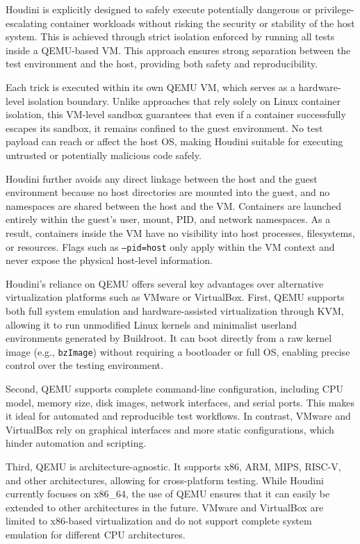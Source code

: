 \begin{doublespace}
Houdini is explicitly designed to safely execute potentially dangerous or privilege-escalating container workloads without risking the security or stability of the host system. This is achieved through strict isolation enforced by running all tests inside a QEMU-based VM. This approach ensures strong separation between the test environment and the host, providing both safety and reproducibility.

Each trick is executed within its own QEMU VM, which serves as a hardware-level isolation boundary. Unlike approaches that rely solely on Linux container isolation, this VM-level sandbox guarantees that even if a container successfully escapes its sandbox, it remains confined to the guest environment. No test payload can reach or affect the host OS, making Houdini suitable for executing untrusted or potentially malicious code safely.

Houdini further avoids any direct linkage between the host and the guest environment because no host directories are mounted into the guest, and no namespaces are shared between the host and the VM. Containers are launched entirely within the guest's user, mount, PID, and network namespaces. As a result, containers inside the VM have no visibility into host processes, filesystems, or resources. Flags such as \texttt{--pid=host} only apply within the VM context and never expose the physical host-level information.

Houdini's reliance on QEMU offers several key advantages over alternative virtualization platforms such as VMware or VirtualBox. First, QEMU supports both full system emulation and hardware-assisted virtualization through KVM, allowing it to run unmodified Linux kernels and minimalist userland environments generated by Buildroot. It can boot directly from a raw kernel image (e.g., \texttt{bzImage}) without requiring a bootloader or full OS, enabling precise control over the testing environment.

Second, QEMU supports complete command-line configuration, including CPU model, memory size, disk images, network interfaces, and serial ports. This makes it ideal for automated and reproducible test workflows. In contrast, VMware and VirtualBox rely on graphical interfaces and more static configurations, which hinder automation and scripting.

Third, QEMU is architecture-agnostic. It supports x86, ARM, MIPS, RISC-V, and other architectures, allowing for cross-platform testing. While Houdini currently focuses on x86\_64, the use of QEMU ensures that it can easily be extended to other architectures in the future. VMware and VirtualBox are limited to x86-based virtualization and do not support complete system emulation for different CPU architectures.


\end{doublespace}
